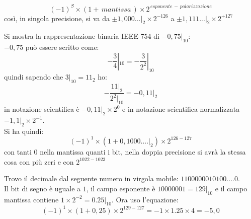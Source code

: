 \documentclass[a4paper,12pt, oneside]{book}
\begin{document}
\begin{enumerate}
	      $$(-1)^S\times(1+\, mantissa\,)\times 2^{\,esponente\,-\,polarizzazione} $$
	      così, in singola precisione, si va da $\pm 1,000...|_2\times 2^{-126}$ a $\pm 1,111...|_2\times 2^{+127}$
	      \begin{esempio}
		      Si mostra la rappresentazione binaria IEEE 754 di $-0,75|_{10}$:\\
		      $-0,75$ può essere scritto come:
		      $$-\frac{3}{4}|_{10}=-\frac{3}{2^2}|_{10}$$
		      quindi sapendo che $3|_{10}=11_{2}$ ho:
		      $$-\frac{11|_2}{2^2|_{10}}=-0,11|_2$$
		      in notazione scientifica è $-0,11|_2\times 2^0$ e in notazione scientifica normalizzata $-1,1|_{2}\times 2^{-1}$.\\ Si ha quindi:
		      $$(-1)^1\times (1+0,1000....|_2)\times 2^{126-127}$$
		      con tanti 0 nella mantissa quanti i bit, nella doppia precisione si avrà la stessa cosa con più zeri e con $2^{1022-1023}$
	      \end{esempio}
	      \begin{esempio}
		      Trovo il decimale dal seguente numero in virgola mobile: $1100000010100....0$.\\ Il bit di segno è uguale a $1$, il campo esponente è $10000001=129|_{10}$ e il campo mantissa contiene $1\times 2^{-2}=0.25|_{10}$. Ora uso l'equazione:
		      $$(-1)^1\times (1+0,25)\times 2^{129-127}= -1\times 1.25\times 4=-5,0$$
	      \end{esempio}
\end{enumerate}
\end{document}
